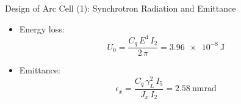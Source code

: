 \documentclass{beamer}
\begin{document}
\begin{frame}[t]{Design of Arc Cell (1): Synchrotron Radiation and Emittance}
\begin{itemize}
\item Energy loss:
\begin{equation}
U_0 = \frac{C_q\,E^4\,I_2}{2\,\pi}=\SI{3.96e-8}{\joule}
\end{equation}
\item Emittance:
\begin{equation}
\epsilon_x = \frac{C_q\,\gamma_L^2\,I_5}{J_x\,I_2}=\SI{2.58}{\nano\meter\radian}
\end{equation}
\end{itemize}
\end{frame}
\end{document}
